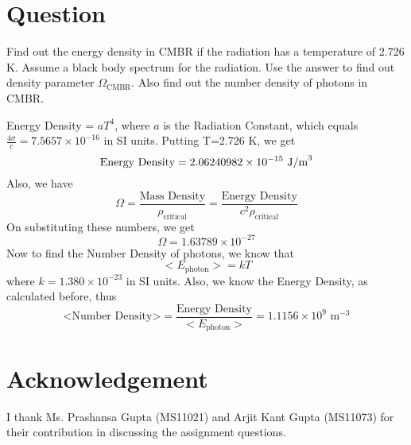 \documentclass[paper=a4, fontsize=11pt]{scrartcl} %
\numberwithin{equation}{section} %
\numberwithin{figure}{section} %
\numberwithin{table}{section} %
\begin{document}
\section{Question}
	Find out the energy density in CMBR if the radiation has a temperature of 2.726 K. Assume a black body spectrum for the radiation. Use the answer to find out density parameter $\Omega_\text{CMBR}$. Also find out the number density of photons in CMBR.
	\par
	Energy Density = $aT^4$, where $a$ is the Radiation Constant, which equals $\frac{4\sigma}{c}=7.5657\times 10^{-16}$ in SI units. Putting T=2.726 K, we get\\
	\begin{equation}
		\text{Energy Density} = 2.06240982 \times 10^{-15} \text{ J/m}^3 \\
	\end{equation}
	Also, we have
	\begin{equation}
		\Omega = \frac{\text{Mass Density}}{\rho_\text{critical}} =  \frac{\text{Energy Density}}{c^2 \rho_\text{critical}}
	\end{equation}
	On substituting these numbers, we get
	\begin{equation}
		\Omega = 1.63789\times10^{-27}
	\end{equation}
	Now to find the Number Density of photons, we know that
	\begin{equation}
		<E_\text{photon}>=kT
	\end{equation}
	where $k=1.380\times10^{-23}$ in SI units. Also, we know the Energy Density, as calculated before, thus
	\begin{equation}
		\text{<Number Density>} = \frac{\text{Energy Density}}{<E_\text{photon}>} = 1.1156 \times 10^9 \text{ m}^{-3}
	\end{equation}
	\par	
\section*{Acknowledgement}
	I thank Ms. Prashansa Gupta (MS11021) and Arjit Kant Gupta (MS11073) for their contribution in discussing the assignment questions.
\end{document}
